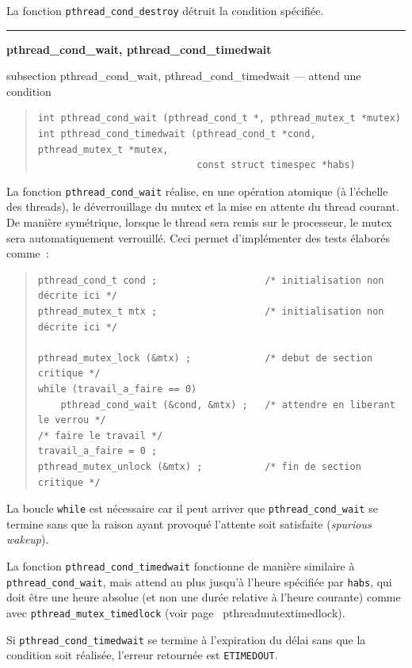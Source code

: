 \documentclass [twoside] {report}
\newcommand {\primitive} [1]
    {
	\phantomsection
	{\large \textbf {#1}}
	\addcontentsline {toc} {subsection} {#1}
    }
\newcommand {\separation}
    {
	\vspace {5mm}
	\nopagebreak
	\hrule
    }
\begin{document}
La fonction \verb|pthread_cond_destroy| détruit la condition spécifiée.


\separation
\primitive {pthread\_cond\_wait, pthread\_cond\_timedwait} --- attend une condition

\begin {quote}
\begin {verbatim}
int pthread_cond_wait (pthread_cond_t *, pthread_mutex_t *mutex)
int pthread_cond_timedwait (pthread_cond_t *cond, pthread_mutex_t *mutex,
                            const struct timespec *habs)
\end{verbatim}
\end {quote}

La fonction \verb|pthread_cond_wait| réalise, en une opération atomique
(à l'échelle des threads), le déverrouillage du mutex et la mise en
attente du thread courant. De manière symétrique, lorsque le thread
sera remis sur le processeur, le mutex sera automatiquement verrouillé.
Ceci permet d'implémenter des tests élaborés comme~:

\begin {quote}
\small
\begin {verbatim}
pthread_cond_t cond ;                   /* initialisation non décrite ici */
pthread_mutex_t mtx ;                   /* initialisation non décrite ici */

pthread_mutex_lock (&mtx) ;             /* debut de section critique */
while (travail_a_faire == 0)
    pthread_cond_wait (&cond, &mtx) ;   /* attendre en liberant le verrou */
/* faire le travail */
travail_a_faire = 0 ;
pthread_mutex_unlock (&mtx) ;           /* fin de section critique */
\end{verbatim}
\end {quote}

La boucle \texttt {while} est nécessaire car il peut arriver que
\verb|pthread_cond_wait| se termine sans que la raison ayant provoqué
l'attente soit satisfaite (\textit {spurious wakeup}).

La fonction \verb|pthread_cond_timedwait| fonctionne de manière
similaire à \verb|pthread_cond_wait|, mais attend au plus
jusqu'à l'heure spécifiée par \texttt {habs}, qui doit être
une heure absolue (et non une durée relative à l'heure courante)
comme avec \verb|pthread_mutex_timedlock| (voir page~\pageref
{pthreadmutextimedlock}).

Si \verb|pthread_cond_timedwait| se termine à l'expiration du délai
sans que la condition soit réalisée, l'erreur retournée est \texttt
{ETIMEDOUT}.
\end{document}
